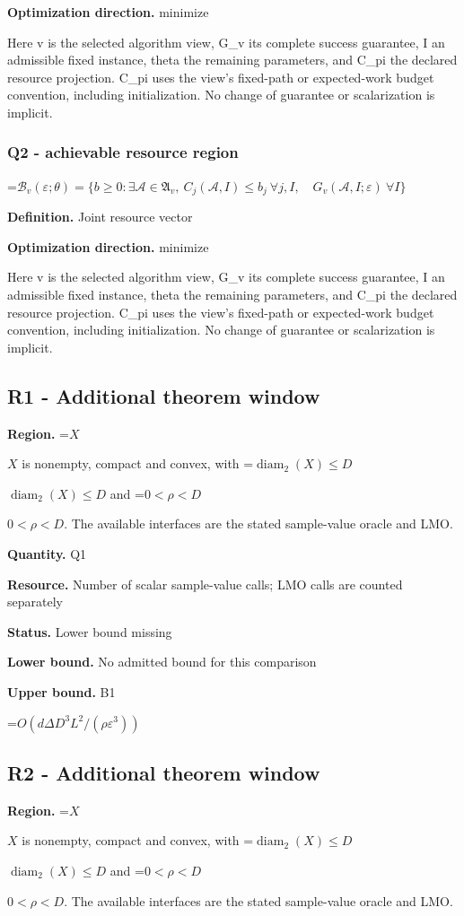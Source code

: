 \documentclass[10pt,a4paper]{article}
\newcommand{\AtlasMath}[1]{\par\begingroup\centering\setbox0=\hbox{$\displaystyle #1$}\ifdim\wd0>1.4\linewidth\typeout{ATLAS WIDE FORMULA: \the\wd0}\fi\ifdim\wd0>\linewidth\resizebox{\linewidth}{!}{\box0}\else\box0\fi\par\endgroup}
\newcommand{\AtlasInlineMath}[1]{\begingroup\setbox0=\hbox{$#1$}\ifdim\wd0>.4\linewidth\endgroup\AtlasMath{#1}\else\endgroup$#1$\fi}
\begin{document}
\textbf{Optimization direction.} minimize

Here v is the selected algorithm view, G\_v its complete success guarantee, I an admissible fixed instance, theta the remaining parameters, and C\_pi the declared resource projection. C\_pi uses the view's fixed-path or expected-work budget convention, including initialization. No change of guarantee or scalarization is implicit.

\subsubsection{Q2 - achievable resource region}
\AtlasMath{\mathcal B_v(\varepsilon;\theta)=\{b\ge0:\exists\mathcal A\in\mathfrak A_v,\ C_j(\mathcal A,I)\le b_j\ \forall j,I,\quad G_v(\mathcal A,I;\varepsilon)\ \forall I\}}
\textbf{Definition.} Joint resource vector

\textbf{Optimization direction.} minimize

Here v is the selected algorithm view, G\_v its complete success guarantee, I an admissible fixed instance, theta the remaining parameters, and C\_pi the declared resource projection. C\_pi uses the view's fixed-path or expected-work budget convention, including initialization. No change of guarantee or scalarization is implicit.

\subsection{R1 - Additional theorem window}
\textbf{Region.} \AtlasInlineMath{X} is nonempty, compact and convex, with \AtlasInlineMath{\operatorname{diam}_2(X)\le D} and \AtlasInlineMath{0<\rho<D}. The available interfaces are the stated sample-value oracle and LMO.

\textbf{Quantity.} Q1

\textbf{Resource.} Number of scalar sample-value calls; LMO calls are counted separately

\textbf{Status.} Lower bound missing

\textbf{Lower bound.} No admitted bound for this comparison

\textbf{Upper bound.} B1

\AtlasMath{O(d\Delta D^3L^2/(\rho\varepsilon^3))}
\subsection{R2 - Additional theorem window}
\textbf{Region.} \AtlasInlineMath{X} is nonempty, compact and convex, with \AtlasInlineMath{\operatorname{diam}_2(X)\le D} and \AtlasInlineMath{0<\rho<D}. The available interfaces are the stated sample-value oracle and LMO.
\end{document}
